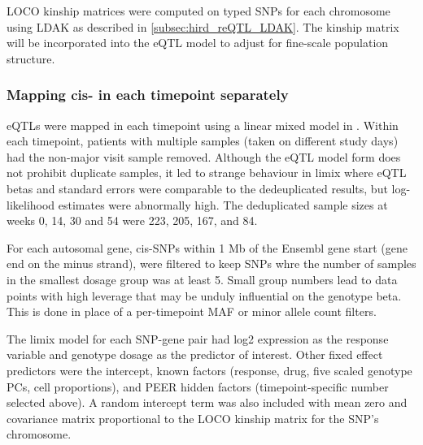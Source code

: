\Gls{LOCO} kinship matrices were computed on typed \glspl{SNP} for each chromosome using LDAK as described in \autoref{subsec:hird_reQTL_LDAK}.
The kinship matrix will be incorporated into the \gls{eQTL} model to adjust for fine-scale population structure.

\subsubsection{Mapping cis- in each timepoint separately}

\glspl{eQTL} were mapped in each timepoint using a linear mixed model in .
Within each timepoint, patients with multiple samples (taken on different study days) had the non-major visit sample removed.
%
%
Although the \gls{eQTL} model form does not prohibit duplicate samples,
it led to strange behaviour in limix where \gls{eQTL} betas and standard errors were comparable to the dedeuplicated results,
but log-likelihood estimates were abnormally high.
The deduplicated sample sizes at weeks 0, 14, 30 and 54 were 223, 205, 167, and 84.

%
For each autosomal gene, cis-\glspl{SNP} within 1 Mb of the Ensembl gene start (gene end on the minus strand),
were filtered to keep \glspl{SNP} whre the number of samples in the smallest dosage group was at least 5.
Small group numbers lead to data points with high leverage that may be unduly influential on the genotype beta.
This is done in place of a per-timepoint \gls{MAF} or minor allele count filters.

The limix model for each \gls{SNP}-gene pair had 
log2 expression as the response variable
and genotype dosage as the predictor of interest.
Other fixed effect predictors were
the intercept,
known factors (response, drug, five scaled genotype \glspl{PC}, cell proportions), 
and PEER hidden factors (timepoint-specific number selected above).
A random intercept term was also included with mean zero and covariance matrix proportional to the \gls{LOCO} kinship matrix for the \gls{SNP}'s chromosome.

